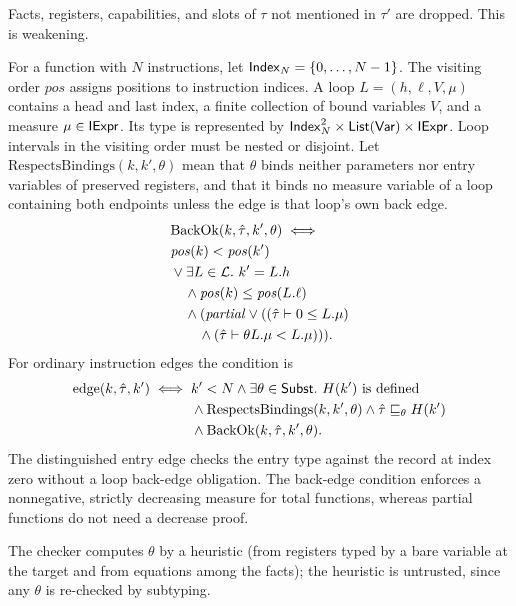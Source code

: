 Facts, registers, capabilities, and slots of $\tau$ not mentioned in $\tau'$ are dropped. This is weakening.

\begin{definition}\label{def:edge}
For a function with $N$ instructions, let $\mathsf{Index}_N=\{0,\ldots,N-1\}$. The visiting order $\mathit{pos}$ assigns positions to instruction indices. A loop $L=(h,\ell,V,\mu)$ contains a head and last index, a finite collection of bound variables $V$, and a measure $\mu\in\mathsf{IExpr}$. Its type is represented by $\mathsf{Index}_N^2\times\mathsf{List}(\mathsf{Var})\times\mathsf{IExpr}$. Loop intervals in the visiting order must be nested or disjoint. Let $\mathrm{RespectsBindings}(k,k',\theta)$ mean that $\theta$ binds neither parameters nor entry variables of preserved registers, and that it binds no measure variable of a loop containing both endpoints unless the edge is that loop's own back edge.
\[
\begin{aligned}
&\mathrm{BackOk}(k,\hat\tau,k',\theta)\iff{}\\ &\mathit{pos}(k)<\mathit{pos}(k')\\
&\lor\exists L\in\mathcal L.\ k'=L.h\\ &\quad\land\mathit{pos}(k)\le\mathit{pos}(L.\ell)\\
&\quad\land(\mathit{partial}\lor((\hat\tau\vdash0\le L.\mu)\\ &\qquad\land(\hat\tau\vdash\theta L.\mu<L.\mu))).
\end{aligned}
\]
For ordinary instruction edges the condition is
\[
\begin{aligned}
\mathrm{edge}(k,\hat\tau,k')\iff{}&k'<N\land\exists\theta\in\Ty{Subst}.\ H(k')\text{ is defined}\\
&\land\mathrm{RespectsBindings}(k,k',\theta)\land\hat\tau\sub{\theta}H(k')\\
&\land\mathrm{BackOk}(k,\hat\tau,k',\theta).
\end{aligned}
\]
The distinguished entry edge checks the entry type against the record at index zero without a loop back-edge obligation. The back-edge condition enforces a nonnegative, strictly decreasing measure for total functions, whereas partial functions do not need a decrease proof.
\end{definition}

The checker computes $\theta$ by a heuristic (from registers typed by a bare variable at the target and from equations among the facts); the heuristic is untrusted, since any $\theta$ is re-checked by subtyping.

